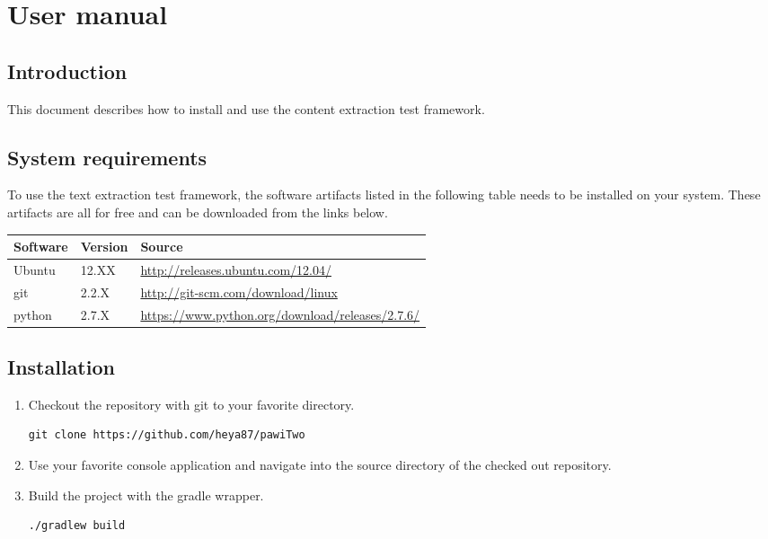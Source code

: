 
\chapter{User manual} %

\label{User manual} %



\section{Introduction}

This document describes how to install and use the content extraction test framework.

\section{System requirements}

To use the text extraction test framework, the software artifacts listed in the following table needs to be installed on your system. These artifacts are all for free and can be downloaded from the links below.

\begin{tabular}{| p{2cm} | p{1.5cm} | p{9.5cm} |} 
	\hline
	\textbf{Software} & \textbf{Version} & \textbf{Source} \\ \hline
	Ubuntu & 12.XX & \url{http://releases.ubuntu.com/12.04/} \\ \hline
	git & 2.2.X & \url{http://git-scm.com/download/linux} \\ \hline
	python & 2.7.X & \url{https://www.python.org/download/releases/2.7.6/} \\ \hline
\end{tabular}


\section{Installation}

\begin{enumerate}

\item Checkout the repository with git to your favorite directory.
\begin{lstlisting}
git clone https://github.com/heya87/pawiTwo
\end{lstlisting}


\item Use your favorite console application and navigate into the source directory of the checked out repository.

\item Build the project with the gradle wrapper.
\begin{lstlisting}
./gradlew build
\end{lstlisting}

\end{enumerate}


